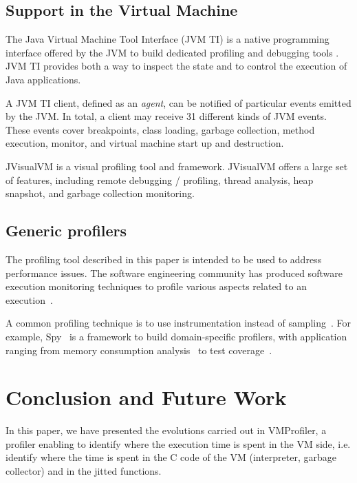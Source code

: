 \documentclass[10pt,nonatbib]{sigplanconf}
\newcommand{\seclabel}[1]{\label{sec:#1}}
\begin{document}
\subsection{Support in the Virtual Machine}

The Java Virtual Machine Tool Interface (JVM TI) is a native programming interface offered by the JVM to build dedicated profiling and debugging tools \cite{JVMTI}. JVM TI provides both a way to inspect the state and to control the execution of Java applications. %

A JVM TI client, defined as an \emph{agent}, can be notified of particular events emitted by the JVM. In total, a client may receive 31 different kinds of JVM events. These events cover breakpoints, class loading, garbage collection, method execution, monitor, and virtual machine start up and destruction.

JVisualVM \cite{JVisualVM} is a visual profiling tool and framework. JVisualVM offers a large set of features, including remote debugging / profiling, thread analysis, heap snapshot, and garbage collection monitoring. 

\subsection{Generic profilers}

The profiling tool described in this paper is intended to be used to address performance issues. The software engineering community has produced software execution monitoring techniques to profile various aspects related to an execution~\cite{Ress12a,Ress12b}. 

A common profiling technique is to use instrumentation instead of sampling~\cite{Metz05a}. For example, Spy~\cite{Berg11h} is a framework to build domain-specific profilers, with application ranging from memory consumption analysis~\cite{Infa15a} to test coverage~\cite{Berg12c}.


\section{Conclusion and Future Work}\seclabel{conclusion}

In this paper, we have presented the evolutions carried out in VMProfiler, a profiler enabling to identify where the execution time is spent in the VM side, i.e. identify where the time is spent in the C code of the VM (interpreter, garbage collector) and in the jitted functions.
\end{document}

